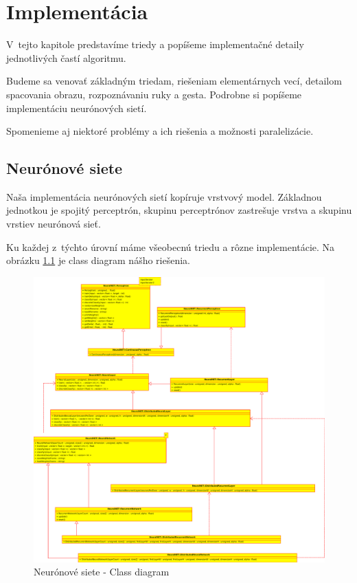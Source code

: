 \chapter{Implementácia}
\label{chap:implementation}

V~tejto kapitole predstavíme triedy a popíšeme implementačné detaily jednotlivých častí algoritmu.

Budeme sa venovať základným triedam, riešeniam elementárnych vecí, detailom spacovania obrazu, rozpoznávaniu ruky a gesta. Podrobne si popíšeme implementáciu neurónových sietí.

Spomenieme aj niektoré problémy a ich riešenia a možnosti paralelizácie.

\bigskip

\section{Neurónové siete}

Naša implementácia neurónových sietí kopíruje vrstvový model. Základnou jednotkou je spojitý perceptrón, skupinu perceptrónov zastrešuje vrstva a skupinu vrstiev neurónová sieť. 

Ku každej z~týchto úrovní máme všeobecnú triedu a rôzne implementácie. Na obrázku \ref{fig:nnclsdiag} je class diagram nášho riešenia.

\begin{figure}[htp]
    \centering
    \includegraphics[width=\textwidth]{images/nn_class_diagram}
    \caption{Neurónové siete - Class diagram}
    \label{fig:nnclsdiag}
\end{figure}


